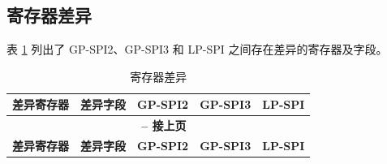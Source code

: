 \documentclass[main\_\_CN.tex]{subfiles}
\begin{document}
\subsection{寄存器差异}

表 \ref{tab:register-differences} 列出了 GP-SPI2、GP-SPI3 和 LP-SPI 之间存在差异的寄存器及字段。

\begin{longtable}{|p{4.0cm}|p{6.0cm}|p{1.5cm}|p{1.5cm}|p{1.5cm}|}
\caption{寄存器差异}\label{tab:register-differences}
\\
\hline
\rowcolor{lightgray}   
\textbf{差异寄存器}   & \textbf{差异字段} & \textbf{GP-SPI2} & \textbf{GP-SPI3}  & \textbf{LP-SPI} \\ \hline
    \endfirsthead
    \multicolumn{5}{c}{\bfseries \tablename\ \thetable{} -- 接上页}\\\hline
    \rowcolor{lightgray}
    \textbf{差异寄存器}   & \textbf{差异字段} & \textbf{GP-SPI2} & \textbf{GP-SPI3}  & \textbf{LP-SPI}\\\hline
    \endhead
    

\end{longtable}
\end{document}
